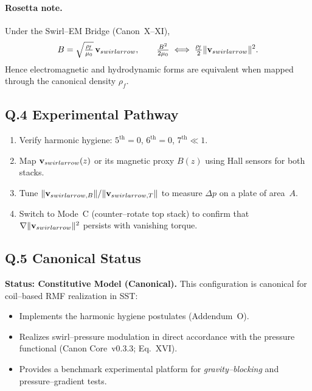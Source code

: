 \documentclass[12pt]{article}
\DeclareRobustCommand{\swirlarrow}{
\mathchoice{\mkern-2mu\scriptstyle\boldsymbol{\circlearrowleft}}%
{\mkern-2mu\scriptstyle\boldsymbol{\circlearrowleft}}%
{\mkern-2mu\scriptscriptstyle\boldsymbol{\circlearrowleft}}%
{\mkern-2mu\scriptscriptstyle\boldsymbol{\circlearrowleft}}
}%
\begin{document}
        \paragraph*{Rosetta note.}
            Under the Swirl--EM Bridge (Canon~X--XI),
            \[
                B = \sqrt{\tfrac{\rho_{\!f}}{\mu_0}}\,
                \mathbf{v}_{\\swirlarrow},
                \qquad
                \tfrac{B^{2}}{2\mu_0}
                \;\Longleftrightarrow\;
                \tfrac{\rho_{\!f}}{2}
                \lVert\mathbf{v}_{\\swirlarrow}\rVert^{2}.
            \]
            Hence electromagnetic and hydrodynamic forms are equivalent when mapped
            through the canonical density $\rho_{\!f}$.

\subsection*{Q.4 Experimental Pathway}
    \begin{enumerate}
    \item Verify harmonic hygiene: $5^{\mathrm{th}}=0$, $6^{\mathrm{th}}=0$, $7^{\mathrm{th}}\!\ll1$.
    \item Map $\mathbf{v}_{\\swirlarrow}(z)$ or its magnetic proxy $B(z)$ using Hall sensors for both stacks.
    \item Tune $\lVert\mathbf{v}_{\\swirlarrow,B}\rVert /
    \lVert\mathbf{v}_{\\swirlarrow,T}\rVert$ to measure
    $\Delta p$ on a plate of area~$A$.
    \item Switch to Mode~C (counter--rotate top stack) to confirm that
    $\nabla\lVert\mathbf{v}_{\\swirlarrow}\rVert^{2}$
    persists with vanishing torque.
    \end{enumerate}

\subsection*{Q.5 Canonical Status}
    \noindent\textbf{Status: Constitutive Model (Canonical).}
    This configuration is canonical for coil--based RMF realization in SST:
    \begin{itemize}
    \item Implements the harmonic hygiene postulates (Addendum~O).
    \item Realizes swirl--pressure modulation in direct accordance with the
    pressure functional (Canon Core~v0.3.3; Eq.~XVI).
    \item Provides a benchmark experimental platform for
    \emph{gravity--blocking} and pressure--gradient tests.
    \end{itemize}



\nocite{*}



\end{document}
